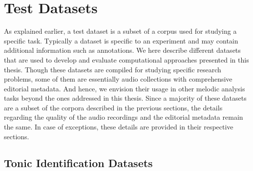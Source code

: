 \section{Test Datasets}
\label{sec:corpus_test_datasets}

As explained earlier, a test dataset is a subset of a corpus used for studying a specific task. Typically a dataset is specific to an experiment and may contain additional information such as annotations. We here describe different datasets that are used to develop and evaluate computational approaches presented in this thesis. Though these datasets are compiled for studying specific research problems, some of them are essentially audio collections with comprehensive editorial metadata. And hence, we envision their usage in other melodic analysis tasks beyond the ones addressed in this thesis. Since a majority of these datasets are a subset of the corpora described in the previous sections, the details regarding the quality of the audio recordings and the editorial metadata remain the same. In case of exceptions, these details are provided in their respective sections. 


\subsection{Tonic Identification Datasets}
\label{sec:corpus_tonic_datasets}


